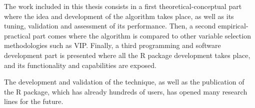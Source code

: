 The work included in this thesis consists in a first theoretical-conceptual part where the idea and development of the algorithm takes place, as well as its tuning, validation and assessment of its performance. Then, a second empirical-practical part comes where the algorithm is compared to other variable selection methodologies such as VIP. Finally, a third programming and software development part is presented where all the R package development takes place, and its functionality and capabilities are exposed.

The development and validation of the technique, as well as the publication of the R package, which has already hundreds of users, has opened many research lines for the future.

\ifEBOOKPDF
	\bigskip
\else
	\vfill
\fi


